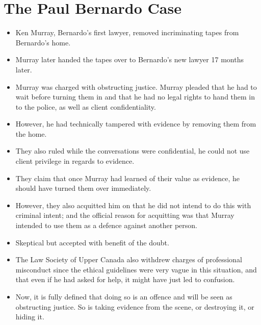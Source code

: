 \documentclass{article}
\begin{document}
\section{The Paul Bernardo Case}
\begin{itemize}
    \item Ken Murray, Bernardo's first lawyer, removed incriminating tapes from Bernardo's home.
    \item Murray later handed the tapes over to Bernardo's new lawyer 17 months later.
    \item Murray was charged with obstructing justice.  Murray pleaded that he had to wait before turning them in and that he had no legal rights to hand them in to the police, as well as client confidentiality.
    \item However, he had technically tampered with evidence by removing them from the home.
    \item They also ruled while the conversations were confidential, he could not use client privilege in regards to evidence.
    \item They claim that once Murray had learned of their value as evidence, he should have turned them over immediately.
    \item However, they also acquitted him on that he did not intend to do this with criminal intent; and the official reason for acquitting was that Murray intended to use them as a defence against another person.
    \item Skeptical but accepted with benefit of the doubt.
    \item The Law Society of Upper Canada also withdrew charges of professional misconduct since the ethical guidelines were very vague in this situation, and that even if he had asked for help, it might have just led to confusion.
    \item Now, it is fully defined that doing so is an offence and will be seen as obstructing justice.  So is taking evidence from the scene, or destroying it, or hiding it.
\end{itemize}
\end{document}
